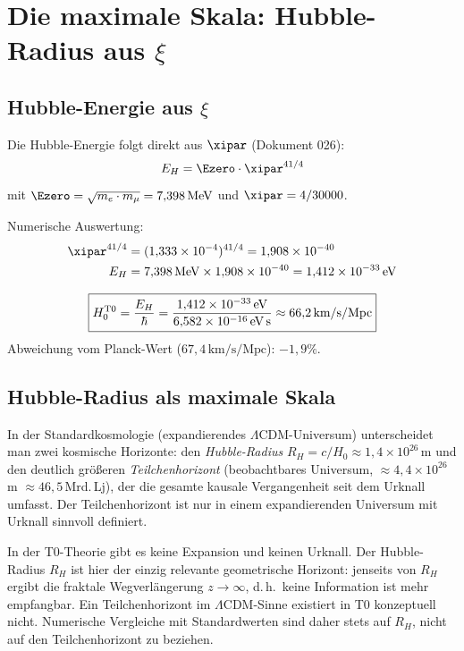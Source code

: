 \section{Die maximale Skala: Hubble-Radius aus \texorpdfstring{$\xi$}{xi}}

\subsection{Hubble-Energie aus \texorpdfstring{$\xi$}{xi}}

Die Hubble-Energie folgt direkt aus $\xipar$ (Dokument 026):
\begin{equation}
	E_H = \Ezero \cdot \xipar^{41/4}
\end{equation}
mit $\Ezero = \sqrt{m_e \cdot m_\mu} = 7{,}398\,\text{MeV}$ und $\xipar = 4/30000$.

Numerische Auswertung:
\begin{align}
	\xipar^{41/4} &= (1{,}333 \times 10^{-4})^{41/4} = 1{,}908 \times 10^{-40} \\
	E_H &= 7{,}398\,\text{MeV} \times 1{,}908 \times 10^{-40} = 1{,}412 \times 10^{-33}\,\text{eV}
\end{align}

\begin{keyresult}
\begin{equation}
	\boxed{H_0^{\text{T0}} = \frac{E_H}{\hbar} = \frac{1{,}412 \times 10^{-33}\,\text{eV}}{6{,}582 \times 10^{-16}\,\text{eV\,s}} \approx 66{,}2\,\text{km/s/Mpc}}
\end{equation}
Abweichung vom Planck-Wert ($67{,}4\,\text{km/s/Mpc}$): $-1{,}9\%$.
\end{keyresult}

\subsection{Hubble-Radius als maximale Skala}

\begin{foundation}
In der Standardkosmologie (expandierendes $\Lambda$CDM-Universum) unterscheidet man zwei kosmische Horizonte: den \textit{Hubble-Radius} $R_H = c/H_0 \approx 1{,}4 \times 10^{26}$\,m und den deutlich größeren \textit{Teilchenhorizont} (beobachtbares Universum, $\approx 4{,}4 \times 10^{26}$\,m $\approx 46{,}5$\,Mrd.\,Lj), der die gesamte kausale Vergangenheit seit dem Urknall umfasst. Der Teilchenhorizont ist nur in einem expandierenden Universum mit Urknall sinnvoll definiert.

In der T0-Theorie gibt es keine Expansion und keinen Urknall. Der Hubble-Radius $R_H$ ist hier der einzig relevante geometrische Horizont: jenseits von $R_H$ ergibt die fraktale Wegverlängerung $z \to \infty$, d.\,h.\ keine Information ist mehr empfangbar. Ein Teilchenhorizont im $\Lambda$CDM-Sinne existiert in T0 konzeptuell nicht. Numerische Vergleiche mit Standardwerten sind daher stets auf $R_H$, nicht auf den Teilchenhorizont zu beziehen.
\end{foundation}

